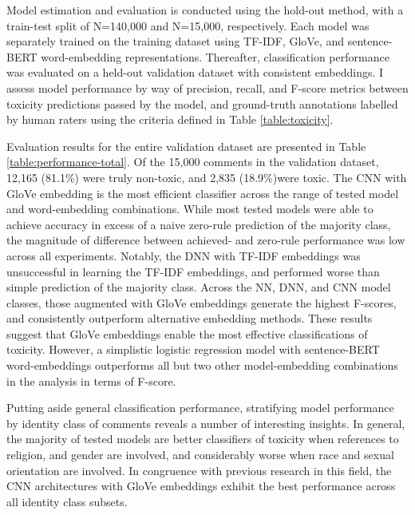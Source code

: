 
Model estimation and evaluation is conducted using the hold-out method, with a train-test split of N=140,000 and N=15,000, respectively. Each model was separately trained on the training dataset using TF-IDF, GloVe, and sentence-BERT word-embedding representations. Thereafter, classification performance was evaluated on a held-out validation dataset with consistent embeddings. I assess model performance by way of precision, recall, and F-score metrics between toxicity predictions passed by the model, and ground-truth annotations labelled by human raters using the criteria defined in Table \ref{table:toxicity}.

Evaluation results for the entire validation dataset are presented in Table \ref{table:performance-total}. Of the 15,000 comments in the validation dataset, 12,165 (81.1\%) were truly non-toxic, and 2,835 (18.9\%)were toxic.  The CNN with GloVe embedding is the most efficient classifier across the range of tested model and word-embedding combinations. While most tested models were able to achieve accuracy in excess of a naive zero-rule prediction of the majority class, the magnitude of difference between achieved- and zero-rule performance was low across all experiments. Notably, the DNN with TF-IDF embeddings was unsuccessful in learning the TF-IDF embeddings, and performed worse than simple prediction of the majority class. Across the NN, DNN, and CNN model classes, those augmented with GloVe embeddings generate the highest F-scores, and consistently outperform alternative embedding methods. These results suggest that GloVe embeddings enable the most effective classifications of toxicity. However, a simplistic logistic regression model with sentence-BERT word-embeddings outperforms all but two other model-embedding combinations in the analysis in terms of F-score. 

Putting aside general classification performance, stratifying model performance by identity class of comments reveals a number of interesting insights. In general, the majority of tested models are better classifiers of toxicity when references to religion, and gender are involved, and considerably worse when race and sexual orientation are involved. In congruence with previous research in this field, the CNN architectures with GloVe embeddings exhibit the best performance across all identity class subsets. 

